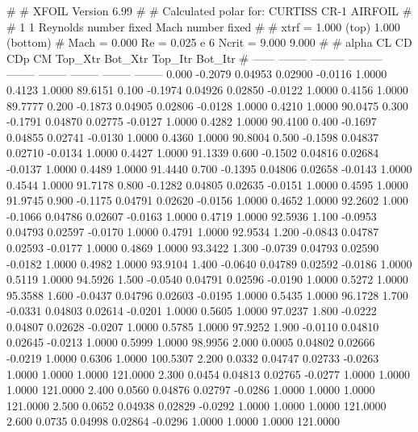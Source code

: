 #  
#       XFOIL         Version 6.99
#  
# Calculated polar for: CURTISS CR-1 AIRFOIL                            
#  
# 1 1 Reynolds number fixed          Mach number fixed         
#  
# xtrf =   1.000 (top)        1.000 (bottom)  
# Mach =   0.000     Re =     0.025 e 6     Ncrit =   9.000  9.000
#  
#   alpha    CL        CD       CDp       CM     Top_Xtr  Bot_Xtr  Top_Itr  Bot_Itr
#  ------ -------- --------- --------- -------- -------- -------- -------- --------
   0.000  -0.2079   0.04953   0.02900  -0.0116   1.0000   0.4123   1.0000  89.6151
   0.100  -0.1974   0.04926   0.02850  -0.0122   1.0000   0.4156   1.0000  89.7777
   0.200  -0.1873   0.04905   0.02806  -0.0128   1.0000   0.4210   1.0000  90.0475
   0.300  -0.1791   0.04870   0.02775  -0.0127   1.0000   0.4282   1.0000  90.4100
   0.400  -0.1697   0.04855   0.02741  -0.0130   1.0000   0.4360   1.0000  90.8004
   0.500  -0.1598   0.04837   0.02710  -0.0134   1.0000   0.4427   1.0000  91.1339
   0.600  -0.1502   0.04816   0.02684  -0.0137   1.0000   0.4489   1.0000  91.4440
   0.700  -0.1395   0.04806   0.02658  -0.0143   1.0000   0.4544   1.0000  91.7178
   0.800  -0.1282   0.04805   0.02635  -0.0151   1.0000   0.4595   1.0000  91.9745
   0.900  -0.1175   0.04791   0.02620  -0.0156   1.0000   0.4652   1.0000  92.2602
   1.000  -0.1066   0.04786   0.02607  -0.0163   1.0000   0.4719   1.0000  92.5936
   1.100  -0.0953   0.04793   0.02597  -0.0170   1.0000   0.4791   1.0000  92.9534
   1.200  -0.0843   0.04787   0.02593  -0.0177   1.0000   0.4869   1.0000  93.3422
   1.300  -0.0739   0.04793   0.02590  -0.0182   1.0000   0.4982   1.0000  93.9104
   1.400  -0.0640   0.04789   0.02592  -0.0186   1.0000   0.5119   1.0000  94.5926
   1.500  -0.0540   0.04791   0.02596  -0.0190   1.0000   0.5272   1.0000  95.3588
   1.600  -0.0437   0.04796   0.02603  -0.0195   1.0000   0.5435   1.0000  96.1728
   1.700  -0.0331   0.04803   0.02614  -0.0201   1.0000   0.5605   1.0000  97.0237
   1.800  -0.0222   0.04807   0.02628  -0.0207   1.0000   0.5785   1.0000  97.9252
   1.900  -0.0110   0.04810   0.02645  -0.0213   1.0000   0.5999   1.0000  98.9956
   2.000   0.0005   0.04802   0.02666  -0.0219   1.0000   0.6306   1.0000 100.5307
   2.200   0.0332   0.04747   0.02733  -0.0263   1.0000   1.0000   1.0000 121.0000
   2.300   0.0454   0.04813   0.02765  -0.0277   1.0000   1.0000   1.0000 121.0000
   2.400   0.0560   0.04876   0.02797  -0.0286   1.0000   1.0000   1.0000 121.0000
   2.500   0.0652   0.04938   0.02829  -0.0292   1.0000   1.0000   1.0000 121.0000
   2.600   0.0735   0.04998   0.02864  -0.0296   1.0000   1.0000   1.0000 121.0000
